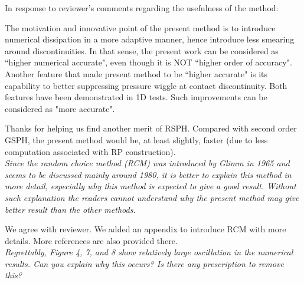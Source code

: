 \documentclass[10pt,a4paper]{article}
\begin{document}
In response to reviewer's comments regarding the usefulness of the method:

The motivation and innovative point of the present method is to introduce numerical dissipation in a more adaptive manner, hence introduce less smearing around discontinuities. In that sense, the present work can be considered as ``higher numerical accurate", even though it is NOT ``higher order of accuracy". Another feature that made present method to be ``higher accurate" is its capability to better suppressing pressure wiggle at contact discontinuity. Both features have been demonstrated in 1D tests. Such improvements can be considered as "more accurate".
 
Thanks for helping us find another merit of RSPH. Compared with second order GSPH, the present method would be, at least slightly, faster (due to less computation associated with RP construction).\\[3pt] 

\textit{Since the random choice method (RCM) was introduced by Glimm in 1965 and seems to be discussed mainly around 1980, it is better to explain this method in more detail, especially why this method is expected to give a good result. Without such explanation the readers cannot understand why the present method may give better result than the other methods.}

We agree with reviewer. We added an appendix to introduce RCM with more details. More references are also provided there.\\[3pt]

\textit{Regrettably, Figure 4, 7, and 8 show relatively large oscillation in the
numerical results. Can you explain why this occurs? Is there any prescription to remove this?}
\end{document}
